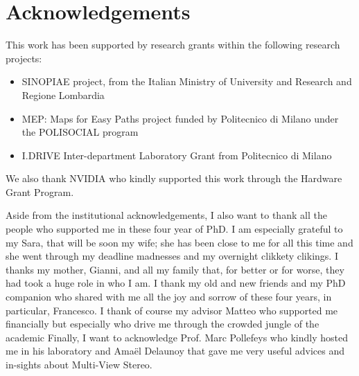  \chapter*{Acknowledgements}
 
 This work has been supported by research grants within the following research projects:
\begin{itemize}
 \item[] SINOPIAE project, from the Italian Ministry of University and Research and Regione Lombardia
 \item[] MEP: Maps for Easy Paths project funded by Politecnico di Milano under the POLISOCIAL program
 \item[] I.DRIVE Inter-department Laboratory Grant from Politecnico di Milano
\end{itemize}
We also thank NVIDIA who kindly supported this work through the Hardware Grant Program.

Aside from the institutional acknowledgements, I also want to thank all the people who supported me in these four year of PhD. 
I am especially grateful to my Sara, that will be soon my wife; she has been close to me for all this time and she went through my deadline madnesses and my overnight clikkety clikings.
I thanks my mother,  Gianni, and all my family that, for better or for worse, they had took a huge role in who I am.
I thank my old and new friends and my PhD companion who shared with me all the joy and sorrow of these four years, in particular, Francesco.  
I thank of course my advisor Matteo who supported me financially but especially who drive me through the crowded jungle of the academic
Finally, I want to acknowledge Prof. Marc Pollefeys who kindly hosted me in his laboratory and Amaël Delaunoy that gave me very useful advices and in-sights about Multi-View Stereo.

